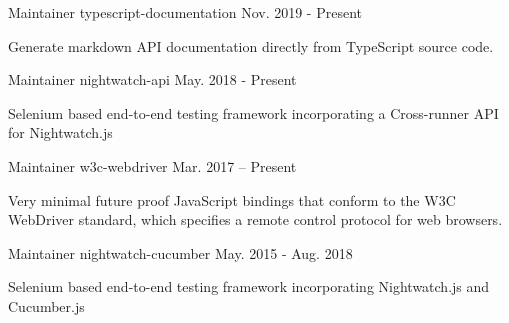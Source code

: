 

\begin{cventries}

  \cventry
    {Maintainer} %
    {typescript-documentation} %
    {} %
    {Nov. 2019 - Present} %
    {
      \begin{cvitems} %
        \item {Generate markdown API documentation directly from TypeScript source code.}
      \end{cvitems}
    }

  \cventry
    {Maintainer} %
    {nightwatch-api} %
    {} %
    {May. 2018 - Present} %
    {
      \begin{cvitems} %
        \item {Selenium based end-to-end testing framework incorporating a Cross-runner API for Nightwatch.js}
      \end{cvitems}
    }

  \cventry
    {Maintainer} %
    {w3c-webdriver} %
    {} %
    {Mar. 2017 – Present} %
    {
      \begin{cvitems} %
        \item {Very minimal future proof JavaScript bindings that conform to the W3C WebDriver standard, which specifies a remote control protocol for web browsers.}
      \end{cvitems}
    }

  \cventry
    {Maintainer} %
    {nightwatch-cucumber} %
    {} %
    {May. 2015 - Aug. 2018} %
    {
      \begin{cvitems} %
        \item {Selenium based end-to-end testing framework incorporating Nightwatch.js and Cucumber.js}
      \end{cvitems}
    }

\end{cventries}
